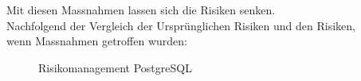 \begin{flushleft}
    Mit diesen Massnahmen lassen sich die Risiken senken.\\
    Nachfolgend der Vergleich der Ursprünglichen Risiken und den Risiken,\\
    wenn Massnahmen getroffen wurden:
    \begin{figure}[H]
        \centering
        \qquad
        \caption{Risikomanagement PostgreSQL}
        \label{fig:riskmanagement_postgresql}
    \end{figure}
\end{flushleft}
\clearpage
{}
\recalctypearea